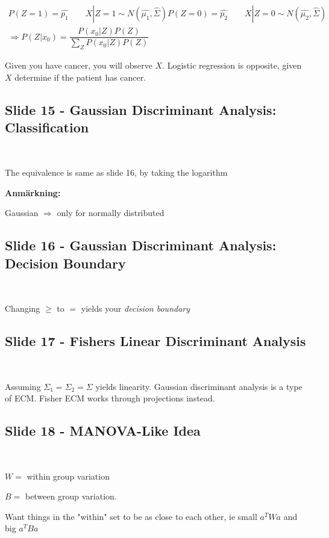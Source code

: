 \par\bigskip

\begin{equation*}
  \begin{gathered}
    P(Z = 1) = \widehat{p_1}\qquad X|Z = 1\sim N(\widehat{\mu_1},\widehat{\Sigma})
    P(Z = 0) = \widehat{p_2}\qquad X|Z = 0\sim N(\widehat{\mu_2},\widehat{\Sigma})\\
    \Rightarrow P(Z|x_0) = \dfrac{P(x_0|Z)P(Z)}{\sum_{Z}P(x_0|Z)P(Z)}
  \end{gathered}
\end{equation*}
\par\bigskip
\noindent Given you have cancer, you will observe $X$. Logistic regression is opposite, given $X$ determine if the patient has cancer. 
\par\bigskip
\subsection{Slide 15 - Gaussian Discriminant Analysis: Classification}\hfill\\\par
\noindent The equivalence is same as slide 16, by taking the logarithm
\par\bigskip
\noindent\textbf{Anmärkning:}\par
\noindent Gaussian $\Rightarrow$ only for normally distributed
\par\bigskip
\subsection{Slide 16 - Gaussian Discriminant Analysis: Decision Boundary}\hfill\\\par
\noindent Changing $\geq$ to $=$ yields your \textit{decision boundary}
\par\bigskip
\subsection{Slide 17 - Fishers Linear Discriminant Analysis}\hfill\\\par
\noindent Assuming $\Sigma_1 = \Sigma_2 = \Sigma$ yields linearity. Gaussian discriminant analysis is a type of ECM. Fisher ECM works through projections instead.
\par\bigskip
\subsection{Slide 18 - MANOVA-Like Idea}\hfill\\\par
\noindent $W = $ within group variation\par
\noindent $B = $ between group variation.
\par\bigskip
\noindent Want things in the "within" set to be as close to each other, ie small $a^TWa$ and big $a^TBa$ 
\par\bigskip
